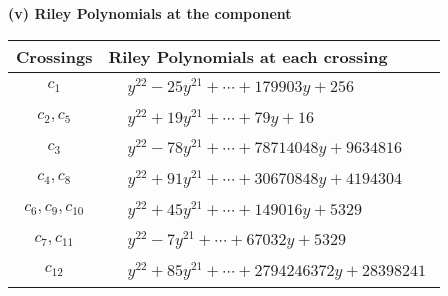 \documentclass[1p]{elsarticle_modified}
\theoremstyle{definition}
\begin{document}
\flushleft \textbf{(v) Riley Polynomials at the component}\newline \\
\begin{tabular}{m{50pt}|m{274pt}}
Crossings & \hspace{64pt}Riley Polynomials at each crossing \\
\hline $$\begin{aligned}c_{1}\end{aligned}$$&$\begin{aligned}
&y^{22}-25 y^{21}+\cdots+179903 y+256
\end{aligned}$\\
\hline $$\begin{aligned}c_{2},c_{5}\end{aligned}$$&$\begin{aligned}
&y^{22}+19 y^{21}+\cdots+79 y+16
\end{aligned}$\\
\hline $$\begin{aligned}c_{3}\end{aligned}$$&$\begin{aligned}
&y^{22}-78 y^{21}+\cdots+78714048 y+9634816
\end{aligned}$\\
\hline $$\begin{aligned}c_{4},c_{8}\end{aligned}$$&$\begin{aligned}
&y^{22}+91 y^{21}+\cdots+30670848 y+4194304
\end{aligned}$\\
\hline $$\begin{aligned}c_{6},c_{9},c_{10}\end{aligned}$$&$\begin{aligned}
&y^{22}+45 y^{21}+\cdots+149016 y+5329
\end{aligned}$\\
\hline $$\begin{aligned}c_{7},c_{11}\end{aligned}$$&$\begin{aligned}
&y^{22}-7 y^{21}+\cdots+67032 y+5329
\end{aligned}$\\
\hline $$\begin{aligned}c_{12}\end{aligned}$$&$\begin{aligned}
&y^{22}+85 y^{21}+\cdots+2794246372 y+28398241
\end{aligned}$\\
\hline
\end{tabular}\\~\\
\end{document}
